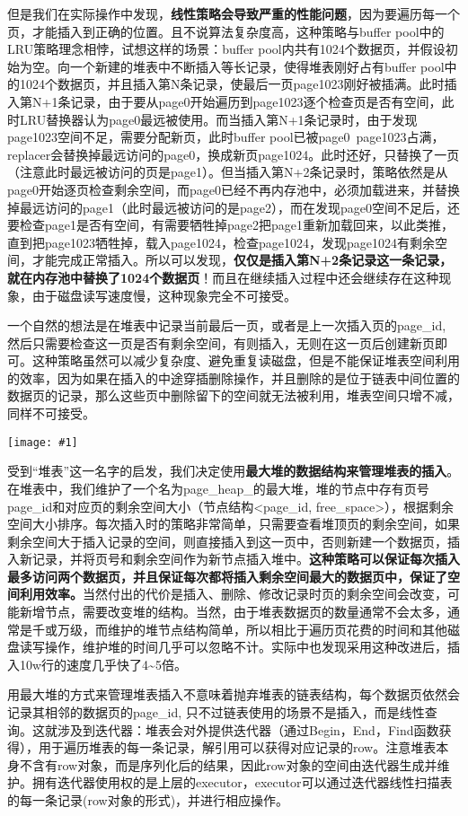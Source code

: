 \documentclass[12pt, a4paper]{article}
\def\b#1{\textbf{#1}}
\def\p{\par}
\def\g#1{\begin{center}\texttt{[image: \#1]}\end{center}}
\begin{document}
\p 但是我们在实际操作中发现，\b{线性策略会导致严重的性能问题}，因为要遍历每一个页，才能插入到正确的位置。且不说算法复杂度高，这种策略与buffer pool中的LRU策略理念相悖，试想这样的场景：buffer pool内共有1024个数据页，并假设初始为空。向一个新建的堆表中不断插入等长记录，使得堆表刚好占有buffer pool中的1024个数据页，并且插入第N条记录，使最后一页page1023刚好被插满。此时插入第N+1条记录，由于要从page0开始遍历到page1023逐个检查页是否有空间，此时LRU替换器认为page0最远被使用。而当插入第N+1条记录时，由于发现page1023空间不足，需要分配新页，此时buffer pool已被page0~page1023占满，replacer会替换掉最远访问的page0，换成新页page1024。此时还好，只替换了一页（注意此时最远被访问的页是page1）。但当插入第N+2条记录时，策略依然是从page0开始逐页检查剩余空间，而page0已经不再内存池中，必须加载进来，并替换掉最远访问的page1（此时最远被访问的是page2），而在发现page0空间不足后，还要检查page1是否有空间，有需要牺牲掉page2把page1重新加载回来，以此类推，直到把page1023牺牲掉，载入page1024，检查page1024，发现page1024有剩余空间，才能完成正常插入。所以可以发现，\b{仅仅是插入第N+2条记录这一条记录，就在内存池中替换了1024个数据页}！而且在继续插入过程中还会继续存在这种现象，由于磁盘读写速度慢，这种现象完全不可接受。
\p 一个自然的想法是在堆表中记录当前最后一页，或者是上一次插入页的page\_id, 然后只需要检查这一页是否有剩余空间，有则插入，无则在这一页后创建新页即可。这种策略虽然可以减少复杂度、避免重复读磁盘，但是不能保证堆表空间利用的效率，因为如果在插入的中途穿插删除操作，并且删除的是位于链表中间位置的数据页的记录，那么这些页中删除留下的空间就无法被利用，堆表空间只增不减，同样不可接受。
\g{imgs/record_5.png}
受到“堆表”这一名字的启发，我们决定使用\b{最大堆的数据结构来管理堆表的插入}。在堆表中，我们维护了一个名为page\_heap\_的最大堆，堆的节点中存有页号page\_id和对应页的剩余空间大小（节点结构<page\_id, free\_space>），根据剩余空间大小排序。每次插入时的策略非常简单，只需要查看堆顶页的剩余空间，如果剩余空间大于插入记录的空间，则直接插入到这一页中，否则新建一个数据页，插入新记录，并将页号和剩余空间作为新节点插入堆中。\b{这种策略可以保证每次插入最多访问两个数据页，并且保证每次都将插入剩余空间最大的数据页中，保证了空间利用效率。}当然付出的代价是插入、删除、修改记录时页的剩余空间会改变，可能新增节点，需要改变堆的结构。当然，由于堆表数据页的数量通常不会太多，通常是千或万级，而维护的堆节点结构简单，所以相比于遍历页花费的时间和其他磁盘读写操作，维护堆的时间几乎可以忽略不计。实际中也发现采用这种改进后，插入10w行的速度几乎快了4\textasciitilde5倍。
\p 用最大堆的方式来管理堆表插入不意味着抛弃堆表的链表结构，每个数据页依然会记录其相邻的数据页的page\_id, 只不过链表使用的场景不是插入，而是线性查询。这就涉及到迭代器：堆表会对外提供迭代器（通过Begin，End，Find函数获得），用于遍历堆表的每一条记录，解引用可以获得对应记录的row。注意堆表本身不含有row对象，而是序列化后的结果，因此row对象的空间由迭代器生成并维护。拥有迭代器使用权的是上层的executor，executor可以通过迭代器线性扫描表的每一条记录(row对象的形式)，并进行相应操作。
\end{document}
